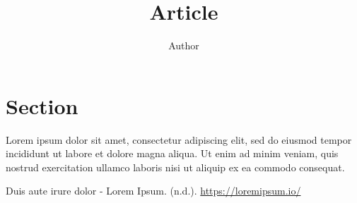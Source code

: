 \documentclass[11pt]{article}
\title{Article}
\author{Author}
\begin{document}
\maketitle

\section{Section}

Lorem ipsum dolor sit amet, consectetur adipiscing elit, sed do eiusmod tempor incididunt ut labore et dolore magna aliqua. Ut enim ad minim veniam, quis nostrud exercitation ullamco laboris nisi ut aliquip ex ea commodo consequat.

\begin{thebibliography}{1}

 Duis aute irure dolor - Lorem Ipsum. (n.d.). \url{https://loremipsum.io/}

\end{thebibliography}
\end{document}

